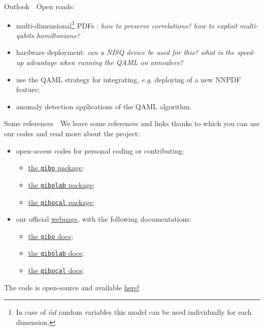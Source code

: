 \documentclass[8pt, xcolor={svgnames}, hyperref={colorlinks, linkcolor=black, citecolor=amethyst, urlcolor=amethyst}]{beamer}
\begin{document}
\begin{frame}{Outlook}
\large
\faArrowCircleRight\,\, Open roads:
\pause
\begin{itemize}
  \item[\faExternalLink] multi-dimensional\footnote<2->{In case of \textit{iid} 
  random variables this model can be used individually for each dimension.} PDFs
  : \textcolor{amethyst}{\textit{how to preserve correlations?
  how to exploit multi-qubits hamiltonians?}}
  \pause
  \item[\faExternalLink] hardware deployment: \textcolor{amethyst}{\textit{can a NISQ device be used for this?
  what is the speed-up advantage when running the QAML on annealers?}}
  \pause
  \item[\faExternalLink] use the QAML strategy for integrating, \textit{e.g.} 
  deploying of a new NNPDF feature;
  \pause
  \item[\faExternalLink] anomaly detection applications of the QAML algorithm.
\end{itemize}
\end{frame}

\begin{frame}{Some references}
\large
\faArrowCircleRight\,\, We leave some references and links thanks to which you can use our codes and read more about the project:

\begin{multicols}{2}
    
\begin{itemize}
\item[\faCode] open-access codes for personal coding or contributing:
    \begin{itemize}[noitemsep]
        \item[\faGithub]  \href{https://github.com/qiboteam/qibo}{the \texttt{qibo} package};
        \item[\faGithub]  \href{https://github.com/qiboteam/qibolab}{the \texttt{qibolab} package};
        \item[\faGithub]  \href{https://github.com/qiboteam/qibocal}{the \texttt{qibocal} package};
    \end{itemize}
 \vspace{1cm}

\item[\faBook] our official \href{https://qibo.science/}{webpage}, with the following documentations:
    \begin{itemize}[noitemsep]
        \item[\faLeanpub]  \href{https://qibo.science/docs/qibo/stable}{the \texttt{qibo} docs};
        \item[\faLeanpub]  \href{https://qibo.science/docs/qibolab/stable}{the \texttt{qibolab} docs};
        \item[\faLeanpub]  \href{https://qibo.science/docs/qibocal/stable}{the \texttt{qibocal} docs};
    \end{itemize}
\end{itemize}
\end{multicols}

The code is open-source and available \href{https://github.com/qiboteam/adiabatic-fit}{here!}
\end{frame}
\end{document}
